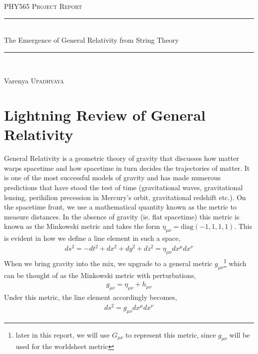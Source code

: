 \documentclass{article}
\newcommand{\HRule}{\rule{\linewidth}{0.3mm}} %
\begin{document}

\begin{center}
\textsc{\Large PHY565 Project Report}\\[0.3cm] %
\HRule \\[0.4cm]
    { \huge The Emergence of General Relativity from String Theory\\}
\HRule \\
\begin{flushright}
    Varenya \textsc{Upadhyaya}\\[1cm] 
\end{flushright}
\end{center} 

\section{Lightning Review of General Relativity}
General Relativity is a geometric theory of gravity that discusses how matter warps spacetime and how spacetime in turn decides the trajectories of matter. It is one of the most successful models of gravity and has made numerous predictions that have stood the test of time (gravitational waves, gravitational lensing, perihilion precession in Mercury's orbit, gravitational redshift etc.). On the spacetime front, we use a mathematical quantity known as the metric to measure distances. In the absence of gravity (ie. flat spacetime) this metric is known as the Minkowski metric and takes the form $\eta_{\mu\nu}=\text{diag}(-1,1,1,1)$. This is evident in how we define a line element in such a space,
\begin{align}
    ds^2 = -dt^2+dx^2+dy^2+dz^2 = \eta_{\mu\nu}dx^\mu dx^\nu
\end{align}
When we bring gravity into the mix, we upgrade to a general metric $g_{\mu\nu}$\footnote{later in this report, we will use $G_{\mu\nu}$ to represent this metric, since $g_{\mu\nu}$ will be used for the worldsheet metric} which can be thought of as the Minkowski metric with perturbations,
\begin{align}
    g_{\mu\nu}=\eta_{\mu\nu}+h_{\mu\nu}
\end{align}
Under this metric, the line element accordingly becomes,
\begin{align}
    ds^2 = g_{\mu\nu}dx^\mu dx^\nu
\end{align}
\end{document}
